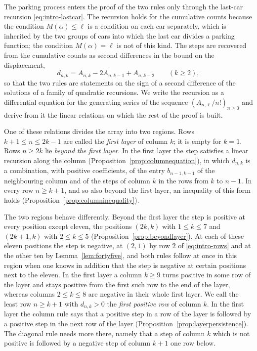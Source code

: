 \documentclass{amsart}
\theoremstyle{definition}
\theoremstyle{remark}
\numberwithin{equation}{section}
\begin{document}
The parking process enters the proof of the two rules only through the
last-car recursion \eqref{eq:intro-lastcar}. The recursion holds for the
cumulative counts because the condition $M(\alpha)\le\ell$ is a condition on
each car separately, which is inherited by the two groups of cars into which
the last car divides a parking function; the condition $M(\alpha)=\ell$ is
not of this kind. The steps are recovered from the cumulative counts as
second differences in the bound on the displacement,
\[
d_{n,k}=A_{n,k}-2A_{n,k-1}+A_{n,k-2}\qquad(k\ge2),
\]
so that the two rules are statements on the sign of a second difference of
the solutions of a family of quadratic recursions. We write the recursion as
a differential equation for the generating series of the sequence
$(A_{n,\ell}/n!)_{n\ge0}$ and derive from it the linear relations on which the rest of
the proof is built.

One of these relations divides the array into two regions. Rows
$k+1\le n\le2k-1$ are called the \emph{first layer} of column $k$; it is
empty for $k=1$. Rows $n\ge2k$ lie \emph{beyond the first layer}. In the
first layer the step satisfies a linear recursion along the column
(Proposition~\ref{prop:columnequation}), in which $d_{n,k}$ is a
combination, with positive coefficients, of the entry $b_{n-1,k-1}$ of the
neighbouring column and of the steps of column $k$ in the rows from $k$ to
$n-1$. In every row $n\ge k+1$, and so also beyond the first layer, an
inequality of this form holds (Proposition~\ref{prop:columninequality}).

The two regions behave differently. Beyond the first layer the step is
positive at every position except eleven, the positions $(2k,k)$ with
$1\le k\le7$ and $(2k+1,k)$ with $2\le k\le5$
(Proposition~\ref{prop:beyondlayer}). At each of these eleven positions the
step is negative, at $(2,1)$ by row $2$ of \eqref{eq:intro-rows} and at the
other ten by Lemma~\ref{lem:fortyfive}, and both rules follow at once in
this region when one knows in addition that the step is negative at certain
positions next to the eleven. In the first layer a column $k\ge9$ turns positive in some row
of the layer and stays positive from the first such row to the end of the
layer, whereas columns $2\le k\le8$ are negative in their whole first layer.
We call the least row $n\ge k+1$ with $d_{n,k}>0$ the \emph{first positive
row} of column $k$. In the first layer the column rule says that a positive
step in a row of the layer is followed by a positive step in the next row of
the layer (Proposition~\ref{prop:layerpersistence}). The diagonal rule needs
more there, namely that a step of column $k$ which is not positive is
followed by a negative step of column $k+1$ one row below.
\end{document}
